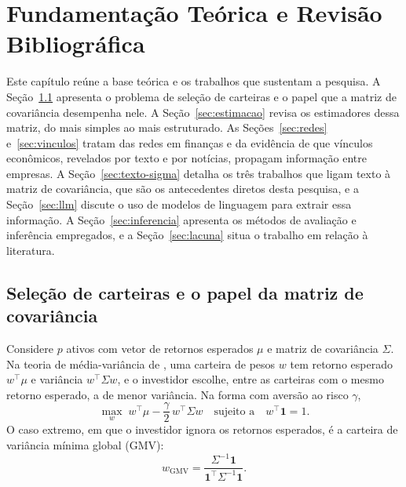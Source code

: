 \chapter{Fundamentação Teórica e Revisão Bibliográfica}
\label{cap:revisao}

Este capítulo reúne a base teórica e os trabalhos que sustentam a pesquisa. A Seção~\ref{sec:carteiras}
apresenta o problema de seleção de carteiras e o papel que a matriz de covariância desempenha nele. A
Seção~\ref{sec:estimacao} revisa os estimadores dessa matriz, do mais simples ao mais estruturado. As
Seções~\ref{sec:redes} e~\ref{sec:vinculos} tratam das redes em finanças e da evidência de que vínculos
econômicos, revelados por texto e por notícias, propagam informação entre empresas. A
Seção~\ref{sec:texto-sigma} detalha os três trabalhos que ligam texto à matriz de covariância, que são
os antecedentes diretos desta pesquisa, e a Seção~\ref{sec:llm} discute o uso de modelos de linguagem
para extrair essa informação. A Seção~\ref{sec:inferencia} apresenta os métodos de avaliação e
inferência empregados, e a Seção~\ref{sec:lacuna} situa o trabalho em relação à literatura.

\section{Seleção de carteiras e o papel da matriz de covariância}
\label{sec:carteiras}

Considere $p$ ativos com vetor de retornos esperados $\mu$ e matriz de covariância $\Sigma$. Na teoria
de média-variância de \citet{markowitz1952}, uma carteira de pesos $w$ tem retorno esperado $w^\top\mu$
e variância $w^\top\Sigma w$, e o investidor escolhe, entre as carteiras com o mesmo retorno esperado,
a de menor variância. Na forma com aversão ao risco $\gamma$,
\begin{equation}
  \max_{w}\; w^\top\mu - \frac{\gamma}{2}\, w^\top\Sigma w
  \quad\text{sujeito a}\quad w^\top\mathbf 1 = 1 .
  \label{eq:markowitz}
\end{equation}
O caso extremo, em que o investidor ignora os retornos esperados, é a carteira de variância mínima
global (GMV):
\begin{equation}
  w_{\mathrm{GMV}} = \frac{\Sigma^{-1}\mathbf 1}{\mathbf 1^\top\Sigma^{-1}\mathbf 1}.
  \label{eq:gmv}
\end{equation}

